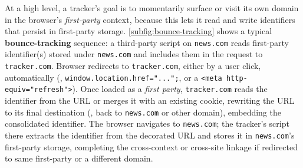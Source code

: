 At a high level, a tracker’s goal is to momentarily surface or visit its own domain in the browser’s \emph{first-party} context, because this lets it read and write identifiers that persist in first-party storage. 
%
\autoref{subfig:bounce-tracking} shows a typical \textbf{bounce-tracking} sequence:
%
 a third-party script on \texttt{news.com} reads first-party identifier(s) stored under \texttt{news.com} and
%
 includes them in the request to \texttt{tracker.com}.
%
 Browser redirects to \texttt{tracker.com}, either by a user click, automatically (\eg{}, \texttt{window.location.href="...";}, or a \texttt{<meta http-equiv="refresh">}).
%
 Once loaded as a \emph{first party}, \texttt{tracker.com} reads the identifier from the URL or merges it with an existing cookie, rewriting the URL to its final destination (\eg{}, back to \texttt{news.com} or other domain), embedding the consolidated identifier.
%
 The browser navigates to \texttt{news.com}; the tracker’s script there extracts the identifier from the decorated URL and 
%
 stores it in \texttt{news.com}’s first-party storage, completing the cross-context or cross-site linkage if redirected to same first-party or a different domain.

